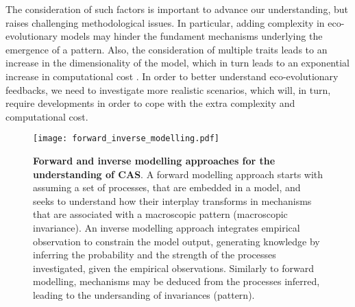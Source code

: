 % 
% 
The consideration of such factors is important to advance our understanding, but raises challenging methodological issues. 
% 
In particular, adding complexity in eco-evolutionary models may hinder the fundament mechanisms underlying the emergence of a pattern.
% 
Also, the consideration of multiple traits leads to an increase in the dimensionality of the model, which in turn leads to an exponential increase in computational cost \citep{Bellman1957}.
% 
In order to better understand eco-evolutionary feedbacks, we need to investigate more realistic scenarios, which will, in turn, require developments in order to cope with the extra complexity and computational cost.
% 

\begin{figure}[t]
    \centering
    \texttt{[image: forward\_inverse\_modelling.pdf]}
    \caption{\textbf{Forward and inverse modelling approaches for the understanding of CAS}. A forward modelling approach starts with assuming a set of processes, that are embedded in a model, and seeks to understand how their interplay transforms in mechanisms that are associated with a macroscopic pattern (macroscopic invariance). An inverse modelling approach integrates empirical observation to constrain the model output, generating knowledge by inferring the probability and the strength of the processes investigated, given the empirical observations. Similarly to forward modelling, mechanisms may be deduced from the processes inferred, leading to the undersanding of invariances (pattern).}
    \label{fig:forward_inverse_modelling}
\end{figure}

